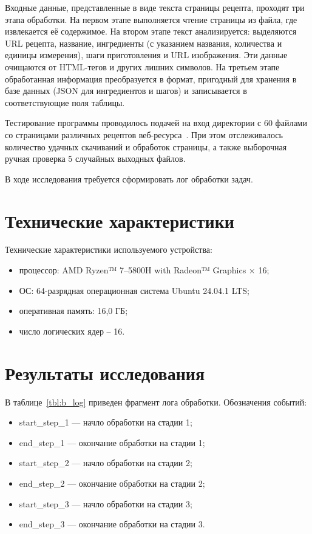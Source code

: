 Входные данные, представленные в виде текста страницы рецепта, проходят три этапа обработки.
На первом этапе выполняется чтение страницы из файла, где извлекается её содержимое.
На втором этапе текст анализируется: выделяются URL рецепта, название, ингредиенты
(с указанием названия, количества и единицы измерения), шаги приготовления и URL изображения.
Эти данные очищаются от HTML-тегов и других лишних символов.
На третьем этапе обработанная информация преобразуется в формат,
пригодный для хранения в базе данных (JSON для ингредиентов и шагов) и
записывается в соответствующие поля таблицы.




Тестирование программы проводилось подачей на вход директории с 60 файлами со страницами различных
рецептов веб-ресурса~\cite{recepies}. При этом отслеживалось количество
удачных скачиваний и обработок страницы, а также выборочная ручная проверка 5 случайных выходных файлов.


В ходе исследования требуется сформировать лог обработки задач.


\section{Технические характеристики}
Технические характеристики используемого устройства:
\begin{itemize}
    \item процессор: AMD Ryzen™ 7--5800H with Radeon™ Graphics × 16;
    \item ОС: 64-разрядная операционная система Ubuntu 24.04.1 LTS;
    \item оперативная память: 16,0 ГБ;
    \item число логических ядер -- 16.
\end{itemize}


\section{Результаты исследования}

В таблице~\ref{tbl:b_log} приведен фрагмент лога обработки. Обозначения событий:
\begin{itemize}
    \item start\_step\_1 — начло обработки на стадии 1;
    \item end\_step\_1 — окончание обработки на стадии 1;
    \item start\_step\_2 — начло обработки на стадии 2;
    \item end\_step\_2 — окончание обработки на стадии 2;
    \item start\_step\_3 — начло обработки на стадии 3;
    \item end\_step\_3 — окончание обработки на стадии 3.
\end{itemize}


